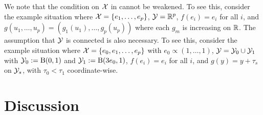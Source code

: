 \documentclass[twoside, 11pt]{article}
\begin{document}
We note that the condition on $\mathcal{X}$ in  cannot be weakened. To see this, consider the example situation where $\mathcal{X} = \{e_1, \dots, e_p\}$, $\mathcal{Y} = \mathbb{R}^p$, $f(e_i) = e_i$ for all $i$, and $g(u_1, \dots, u_p) = (g_1(u_1), \dots, g_p(u_p))$ where each $g_m$ is increasing on $\mathbb{R}$.  
The assumption that $\mathcal{Y}$ is connected is also necessary. To see this, consider the example situation where $\mathcal{X} = \{e_0, e_1, \dots, e_p\}$ with $e_0 \propto (1, \dots, 1)$, $\mathcal{Y} = \mathcal{Y}_0 \cup \mathcal{Y}_1$ with $\mathcal{Y}_0 := \mathrm{B}(0, 1)$ and $\mathcal{Y}_1 := \mathrm{B}(3e_0, 1)$, $f(e_i) = e_i$ for all $i$, and $g(y) = y + \tau_s$ on $\mathcal{Y}_s$, with $\tau_0 < \tau_1$ coordinate-wise.

%
%






\section{Discussion}
\label{sec:discussion}
\end{document}
